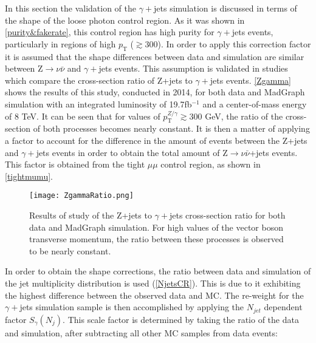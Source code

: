 In this section the validation of the $\gamma+$jets simulation is discussed in terms of the shape of the loose photon control region. As it was shown in \autoref{purity&fakerate}, this control region has high purity for $\gamma+$jets events, particularly in regions of high $p_\text{T}$ ($\gtrsim 300$). In order to apply this correction factor it is assumed that the shape differences between data and simulation are similar between Z$\rightarrow\nu\bar{\nu}$ and $\gamma+$jets events. This assumption is validated in studies which compare the cross-section ratio of Z+jets to $\gamma+$jets events\cite{ZtoGamma}. \autoref{Zgamma} shows the results of this study, conducted in 2014, for both data and MadGraph simulation with an integrated luminosity of 19.7fb$^{-1}$ and a center-of-mass energy of 8 TeV. It can be seen that for values of $p_\text{T}^{Z/\gamma} \gtrsim 300$ GeV, the ratio of the cross-section of both processes becomes nearly constant. It is then a matter of applying a factor to account for the difference in the amount of events between the Z+jets and $\gamma+$jets events in order to obtain the total amount of Z$\rightarrow\nu\bar{\nu}$+jets events. This factor is obtained from the tight $\mu\mu$ control region, as shown in \autoref{tightmumu}.

\begin{figure}[H]
\begin{center}
\texttt{[image: ZgammaRatio.png]}
\end{center}
\vspace{-1em}
\caption[Results of study of the Z+jets to $\gamma+$jets cross-section ratio for both data and MadGraph simulation.]{Results of study of the Z+jets to $\gamma+$jets cross-section ratio for both data and MadGraph simulation. For high values of the vector boson transverse momentum, the ratio between these processes is observed to be nearly constant.}
\label{Zgamma}
\end{figure}

\vspace{1em}

In order to obtain the shape corrections, the ratio between data and simulation of the jet multiplicity distribution is used (\autoref{NjetsCR}). This is due to it exhibiting the highest difference between the observed data and MC. The re-weight for the $\gamma+$jets simulation sample is then accomplished by applying the $N_{jet}$ dependent factor $S_\gamma(N_j)$. This scale factor is determined by taking the ratio of the data and simulation, after subtracting all other MC samples from data events:

